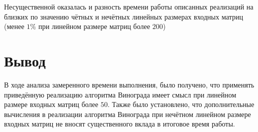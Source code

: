 Несущественной оказалась и разность времени работы описанных реализаций на близких по значению чётных и нечётных линейных размерах входных матриц (менее $1\%$ при линейном размере матриц более $200$)


\section*{Вывод}

В ходе анализа замеренного времени выполнения, было получено, что применять приведённую реализацию алгоритма Винограда имеет смысл при линейном размере входных матриц более $50$. Также было установлено, что дополнительные вычисления в реализации алгоритма Винограда при нечётном линейном размере входных матриц не вносят существенного вклада в итоговое время работы.

\clearpage
